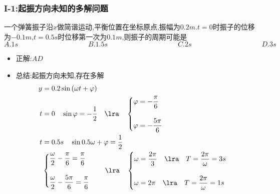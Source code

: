 \documentclass{article}
\begin{document}
\subsubsection{I-1:起振方向未知的多解问题}
一个弹簧振子沿$x$做简谐运动,平衡位置在坐标原点,振幅为$0.2m$.$t= 0$时振子的位移为$-0.1m$,$t = 0.5s$时位移第一次为$0.1m$,则振子的周期可能是
$$
    A. 1s   \hspace{10em}    B. 1.5s      \hspace{10em}    C. 2s      \hspace{10em}    D. 3s
$$

\begin{itemize}
    \item 正解:\quad $AD$
    \item 总结:\quad 起振方向未知,存在多解
          \begin{align*}
              y & = 0.2\sin{(\omega t + \varphi)}                            \\
              t & = 0  \quad  \sin{\varphi} = -\dfrac{1}{2} \quad \lra \quad
              \begin{cases}
                  \varphi = - \dfrac{\pi}{6} \\
                  \,                         \\
                  \varphi = - \dfrac{5\pi}{6}
              \end{cases}                                     \\
              t & = 0.5s \quad \sin{0.5 \omega  + \varphi } = \dfrac{1}{2}   \\
                & \begin{cases}
                      \dfrac{\omega}{2} - \dfrac{\pi}{6} = \dfrac{\pi}{6} \\
                      \,                                                  \\
                      \dfrac{\omega}{2} - \dfrac{5\pi}{6} = \dfrac{\pi}{6}
                  \end{cases}
              \quad \lra  \quad
              \begin{cases}
                  \omega = \dfrac{2\pi}{3} \quad \lra \quad T = \dfrac{2\pi}{\omega} = 3s \\
                  \,                                                                      \\
                  \omega = 2\pi \quad \lra \quad T = \dfrac{2\pi}{\omega} = 1s
              \end{cases}
          \end{align*}


\end{itemize}
\end{document}

